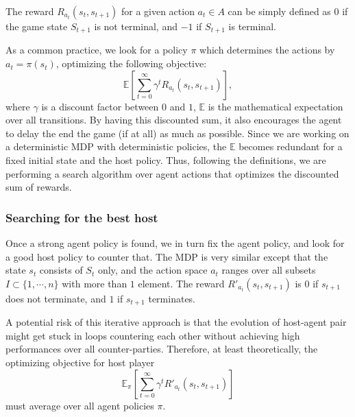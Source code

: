 \documentclass{article}
\theoremstyle{plain}
\theoremstyle{definition}
\theoremstyle{remark}
\begin{document}
The reward $R_{a_t}(s_t, s_{t+1})$ for a given action $a_t\in A$ can be simply defined as $0$ if the game state $S_{t+1}$ is not terminal, and $-1$ if $S_{t+1}$ is terminal.



As a common practice, we look for a policy $\pi$ which determines the actions by $a_t=\pi(s_t)$, optimizing the following objective:
\[\mathbb E\left[\sum\limits_{t=0}^\infty \gamma^t R_{a_t}(s_t, s_{t+1})\right],\]
where $\gamma$ is a discount factor between $0$ and $1$, $\mathbb E$ is the mathematical expectation over all transitions. By having this discounted sum, it also encourages the agent to delay the end the game (if at all) as much as possible. Since we are working on a deterministic MDP with deterministic policies, the $\mathbb E$ becomes redundant for a fixed initial state and the host policy. Thus, following the definitions, we are performing a search algorithm over agent actions that optimizes the discounted sum of rewards.


\subsubsection{Searching for the best host}\label{searching_for_host}
Once a strong agent policy is found, we in turn fix the agent policy, and look for a good host policy to counter that. The MDP is very similar except that the state $s_t$ consists of $S_t$ only, and the action space $a_t$ ranges over all subsets $I\subset\{1,\cdots,n\}$ with more than $1$ element. The reward $R'_{a_t}(s_t, s_{t+1})$ is $0$ if $s_{t+1}$ does not terminate, and $1$ if $s_{t+1}$ terminates.

A potential risk of this iterative approach is that the evolution of host-agent pair might get stuck in loops countering each other without achieving high performances over all counter-parties. Therefore, at least theoretically, the optimizing objective for host player 
\begin{equation}\label{host-obj}
\mathbb E_{\pi}\left[\sum\limits_{t=0}^\infty\gamma^t R'_{a_t}(s_t, s_{t+1})\right]
\end{equation}
must average over all agent policies $\pi$.
\end{document}
